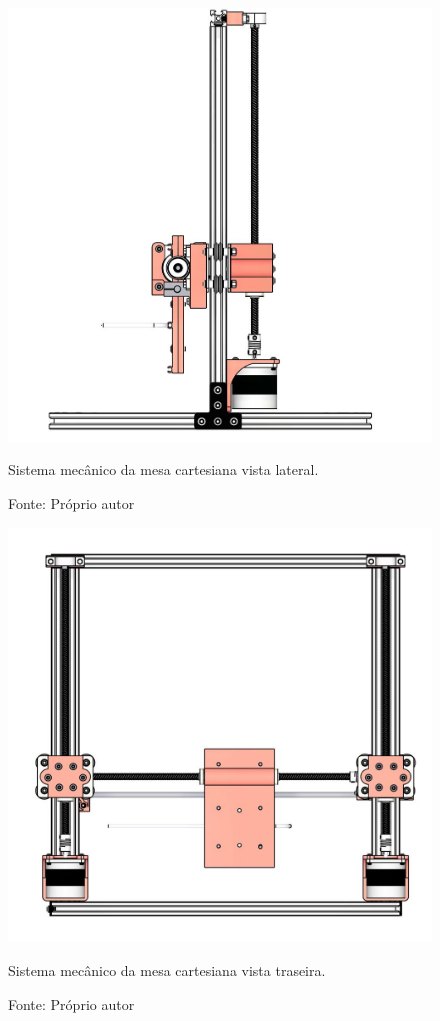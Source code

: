 \begin{figure}[H]
\centering
\includegraphics[scale = 0.35]{figuras/mesacartesianalateral}
\caption{Sistema mecânico da mesa cartesiana vista lateral.}
\caption*{Fonte: Próprio autor}
\label{fig:mesacartesianalateral}
\end{figure}

\label{ap:mesacartesianatraseira}

\begin{figure}[H]
\centering
\includegraphics[scale = 0.35]{figuras/mesacartesianatraseira}
\caption{Sistema mecânico da mesa cartesiana vista traseira.}
\caption*{Fonte: Próprio autor}
\label{fig:mesacartesianatraseira}
\end{figure}
    